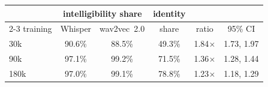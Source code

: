 \begin{tabular}{lccccc}
  \toprule
  & \multicolumn{2}{c}{intelligibility share} & identity & & \\
  \cmidrule(lr){2-3}
  training & Whisper & wav2vec~2.0 & share & ratio & 95\% CI \\
  \midrule
    30k & 90.6\% & 88.5\% & 49.3\% & 1.84$\times$ & 1.73, 1.97 \\
    90k & 97.1\% & 99.2\% & 71.5\% & 1.36$\times$ & 1.28, 1.44 \\
    180k & 97.0\% & 99.1\% & 78.8\% & 1.23$\times$ & 1.18, 1.29 \\
  \bottomrule
\end{tabular}
